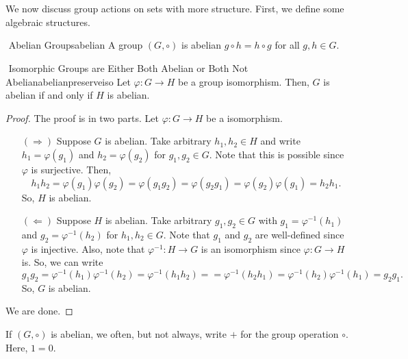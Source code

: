         \vphantom
        \\
        \\
        We now discuss group actions on sets with more structure. First, we define some algebraic structures.
        \begin{definition}{\Stop\,\,Abelian Groups}{abelian}
            A group \((G,\circ)\) is abelian \(g\circ h=h\circ g\) for all \(g,h\in G\).
        \end{definition}
        \begin{proposition}{\Stop\,\,Isomorphic Groups are Either Both Abelian or Both Not Abelian}{abelianpreserveiso}
            Let \(\varphi:G\to H\) be a group isomorphism. Then, \(G\) is abelian if and only if \(H\) is abelian.
            \begin{proof}
                The proof is in two parts. Let \(\varphi:G\to H\) be a isomorphism.
                \begin{itemize}
                    \item[\((\Rightarrow)\)] Suppose \(G\) is abelian. Take arbitrary \(h_1,h_2\in H\) and write \(h_1=\varphi(g_1)\) and \(h_2=\varphi(g_2)\) for \(g_1,g_2\in G\). Note that this is possible since \(\varphi\) is surjective. Then,
                    \begin{equation*}
                        h_1h_2=\varphi(g_1)\varphi(g_2)=\varphi(g_1g_2)=\varphi(g_2g_1)=\varphi(g_2)\varphi(g_1)=h_2h_1.
                    \end{equation*}
                    So, \(H\) is abelian.
                    \item[\((\Leftarrow)\)] Suppose \(H\) is abelian. Take arbitrary \(g_1,g_2\in G\) with \(g_1=\varphi^{-1}(h_1)\) and \(g_2=\varphi^{-1}(h_2)\) for \(h_1,h_2\in G\). Note that \(g_1\) and \(g_2\) are well-defined since \(\varphi\) is injective. Also, note that \(\varphi^{-1}:H\to G\) is an isomorphism since \(\varphi:G\to H\) is. So, we can write
                    \begin{equation*}
                        g_1g_2=\varphi^{-1}(h_1)\varphi^{-1}(h_2)=\varphi^{-1}(h_1h_2)==\varphi^{-1}(h_2h_1)=\varphi^{-1}(h_2)\varphi^{-1}(h_1)=g_2g_1.
                    \end{equation*}
                    So, \(G\) is abelian. 
                \end{itemize}
                We are done. 
            \end{proof}
        \end{proposition}
        \begin{remark*}
            If \((G,\circ)\) is abelian, we often, but not always, write \(+\) for the group operation \(\circ\). Here, \(1=0\).
        \end{remark*}
